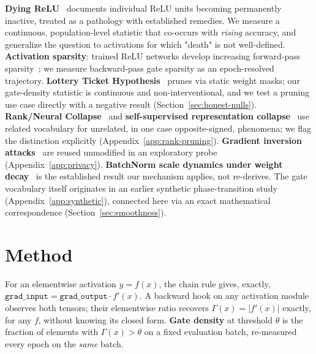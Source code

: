 \documentclass{article}
\begin{document}
\textbf{Dying ReLU}~\citep{lu2019dying} documents individual ReLU units becoming permanently inactive, treated as a pathology with established remedies. We measure a continuous, population-level statistic that co-occurs with \emph{rising} accuracy, and generalize the question to activations for which "death" is not well-defined. \textbf{Activation sparsity}: trained ReLU networks develop increasing forward-pass sparsity~\citep{glorot2010understanding}; we measure backward-pass gate sparsity as an epoch-resolved trajectory. \textbf{Lottery Ticket Hypothesis}~\citep{frankle2019lottery} prunes via static weight masks; our gate-density statistic is continuous and non-interventional, and we test a pruning use case directly with a negative result (Section~\ref{sec:honest-nulls}). \textbf{Rank/Neural Collapse}~\citep{dong2021attention,papyan2020prevalence} and \textbf{self-supervised representation collapse}~\citep{hua2021feature,jing2022understanding} use related vocabulary for unrelated, in one case opposite-signed, phenomena; we flag the distinction explicitly (Appendix~\ref{app:rank-pruning}). \textbf{Gradient inversion attacks}~\citep{zhu2019deep,zhao2020idlg,geiping2020inverting} are reused unmodified in an exploratory probe (Appendix~\ref{app:privacy}). \textbf{BatchNorm scale dynamics under weight decay}~\citep{vanlaarhoven2017l2,hoffer2018norm} is the established result our mechanism applies, not re-derives. The gate vocabulary itself originates in an earlier synthetic phase-transition study (Appendix~\ref{app:synthetic}), connected here via an exact mathematical correspondence (Section~\ref{sec:smoothness}).

\section{Method}
\label{sec:method}

For an elementwise activation $y = f(x)$, the chain rule gives, exactly, $\texttt{grad\_input} = \texttt{grad\_output}\cdot f'(x)$. A backward hook on any activation module observes both tensors; their elementwise ratio recovers $\Gamma(x) = |f'(x)|$ exactly, for any $f$, without knowing its closed form. \textbf{Gate density} at threshold $\theta$ is the fraction of elements with $\Gamma(x) > \theta$ on a fixed evaluation batch, re-measured every epoch on the \emph{same} batch.
\end{document}
